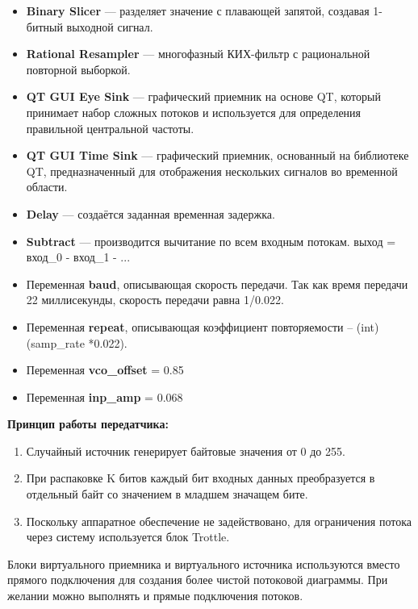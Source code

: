 \documentclass[12pt]{article}
\begin{document}
\begin{itemize}
	\item \textbf{Binary Slicer} --- разделяет значение с плавающей запятой, создавая 1-битный выходной сигнал.
	\item \textbf{Rational Resampler} --- многофазный КИХ-фильтр с рациональной повторной выборкой.
	\item \textbf{QT GUI Eye Sink} --- графический приемник на основе QT, который принимает набор сложных потоков и используется для определения правильной центральной частоты.
	\item \textbf{QT GUI Time Sink} --- графический приемник, основанный на библиотеке QT, предназначенный для отображения нескольких сигналов во временной области.
	\item \textbf{Delay} --- создаётся заданная временная задержка.
	\item \textbf{Subtract} --- производится вычитание по всем входным потокам. выход = вход\_0 - вход\_1 - ...
	\item Переменная \textbf{baud}, описывающая скорость передачи. Так как время передачи 22 миллисекунды, скорость передачи равна 1/0.022. 
	\item Переменная \textbf{repeat}, описывающая коэффициент повторяемости – (int)(samp\_rate *0.022).
	\item Переменная \textbf{vco\_offset} = 0.85 
	\item Переменная \textbf{inp\_amp} = 0.068
\end{itemize}

\textbf{Принцип работы передатчика:}
\begin{enumerate}
	\item Случайный источник генерирует байтовые значения от 0 до 255.
	\item При распаковке K битов каждый бит входных данных преобразуется в отдельный байт со значением в младшем значащем бите. 
	\item Поскольку аппаратное обеспечение не задействовано, для ограничения потока через систему используется блок Trottle.
\end{enumerate}

Блоки виртуального приемника и виртуального источника используются вместо прямого подключения для создания более чистой потоковой диаграммы. При желании можно выполнять и прямые подключения потоков.

\bigskip
\end{document}
